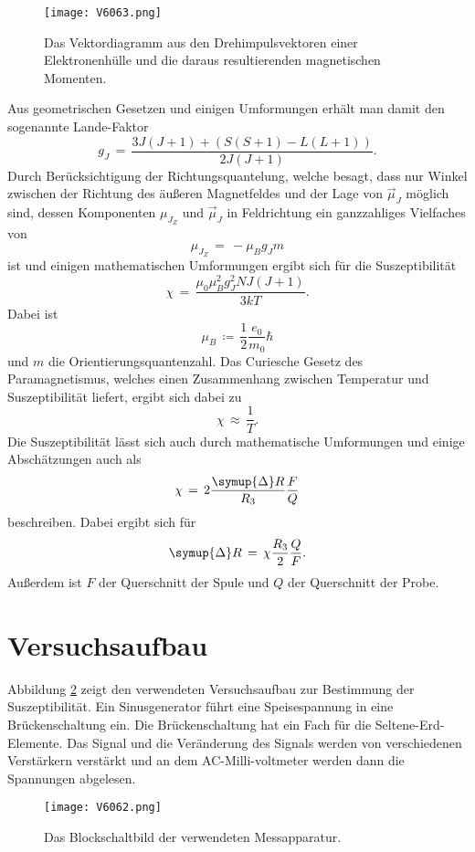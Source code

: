 \documentclass[
  bibliography=totoc,     %
  captions=tableheading,  %
  titlepage=firstiscover, %
]{scrartcl}
\begin{document}
\begin{figure}[H]
  \centering
  \texttt{[image: V6063.png]}
  \caption{Das Vektordiagramm aus den Drehimpulsvektoren einer Elektronenhülle
  und die daraus resultierenden magnetischen Momenten. \cite{anleitung}}
  \label{fig:V6061}
\end{figure}
\noindent
Aus geometrischen Gesetzen und einigen Umformungen erhält man damit den sogenannte Lande-Faktor
\begin{equation}
  g_J\,=\, \frac{3J(J+1)+ (S(S+1)-L(L+1))}{2J(J+1)}.
  \label{eqn:g_j}
\end{equation}
Durch Berücksichtigung der Richtungsquantelung, welche besagt, dass nur Winkel
zwischen der Richtung des äußeren Magnetfeldes und der Lage von $\vec{\mu}_J$
möglich sind, dessen Komponenten $\mu_{J_Z}$ und $\vec{\mu}_J$ in Feldrichtung
ein ganzzahliges Vielfaches von
\begin{equation}
  \mu_{J_Z} \,=\,- \mu_B g_J m
  \label{eqn:mu}
\end{equation}
ist und einigen mathematischen Umformungen ergibt sich für die Suszeptibilität
\begin{equation}
  \chi \,=\, \frac{\mu_0 \mu_B^2 g_J^2 NJ(J+1)}{3kT}.
  \label{eqn:xi}
\end{equation}
Dabei ist
\begin{equation*}
  \mu_B\,\coloneq\,\frac{1}{2} \frac{e_0}{m_0} \hbar
\end{equation*}
und $m$ die Orientierungsquantenzahl.
Das Curiesche Gesetz des Paramagnetismus, welches einen Zusammenhang zwischen
Temperatur und Suszeptibilität liefert, ergibt sich dabei zu
\begin{equation}
  \chi\,\approx\,\frac{1}{T}.
\end{equation}
Die Suszeptibilität lässt sich auch durch mathematische Umformungen und einige
Abschätzungen auch als
\begin{equation}
  \chi\,=\,2\frac{\symup{\Delta}R}{R_3} \frac{F}{Q}
  \label{eqn:xi2}
\end{equation}
beschreiben. Dabei ergibt sich für
\begin{equation*}
  \symup{\Delta}R\,=\,\chi \frac{R_3}{2} \frac{Q}{F}.
\end{equation*}
Außerdem ist $F$ der Querschnitt der Spule und $Q$ der Querschnitt der Probe.

\section{Versuchsaufbau}
\label{sec:aufbau}
Abbildung \ref{fig:V6062} zeigt den verwendeten Versuchsaufbau zur Bestimmung
der Suszeptibilität. Ein Sinusgenerator führt eine Speisespannung in eine
Brückenschaltung ein. Die Brückenschaltung hat ein Fach für die
Seltene-Erd-Elemente. Das Signal und die Veränderung des Signals
werden von verschiedenen Verstärkern verstärkt und an dem AC-Milli-voltmeter
werden dann die Spannungen abgelesen.
\begin{figure}[H]
  \centering
  \texttt{[image: V6062.png]}
  \caption{Das Blockschaltbild der verwendeten Messapparatur. \cite{anleitung}}
  \label{fig:V6062}
\end{figure}
\noindent
\end{document}
